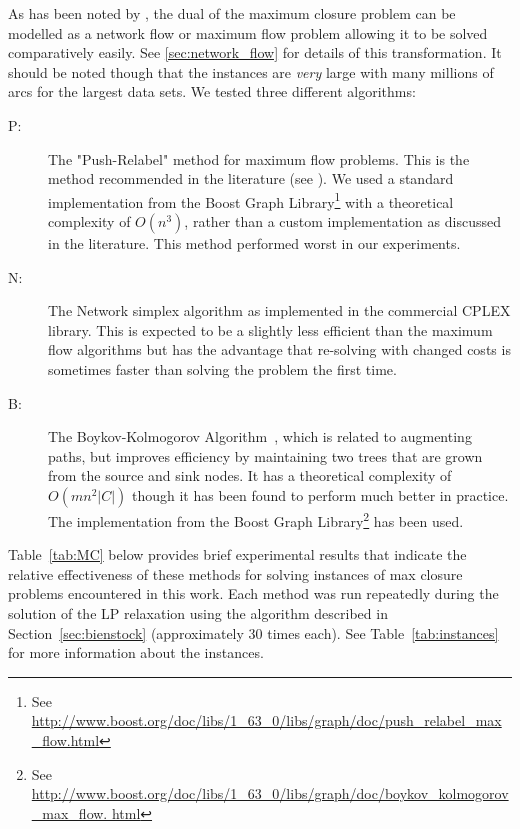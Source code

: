 \documentclass[authoryear,11pt,square,number,times,super,comma]{elsarticle}
\begin{document}
As has been noted by \cite{dorit_s._hochbaum_performance_2000}, the dual of the maximum closure problem can be modelled as a network flow or maximum flow
problem allowing it to be solved comparatively easily. See \ref{sec:network_flow} for details of this transformation. It should be noted
though that the instances are \emph{very} large with many millions of arcs for
the largest data sets. We tested three different algorithms:
\begin{description}
  \item[\quad P:] The "Push-Relabel" method for maximum flow problems. This is the method recommended in the literature (see \cite{dorit_s._hochbaum_performance_2000}). 
  We used a standard implementation from the Boost Graph Library\footnote{See \url{http://www.boost.org/doc/libs/1_63_0/libs/graph/doc/push_relabel_max_flow.html}} 
  with a theoretical complexity of $O(n^3)$, rather than a custom implementation as discussed in the literature. This method performed worst in our 
  experiments.
  \item[\quad N:] The Network simplex algorithm as implemented in the commercial CPLEX library. This is expected to be a slightly less efficient than the maximum 
  flow algorithms but has the advantage that re-solving with changed costs is sometimes faster than solving the problem the first time.
  \item[\quad B:] The Boykov-Kolmogorov Algorithm~\citep{boykov_experimental_2001}, which is related to augmenting paths, but improves efficiency by maintaining two 
  trees that are grown from the source and sink nodes. It has a theoretical complexity of $O(mn^2 |C|)$ though it has been found to perform much better 
  in practice. The implementation from the Boost Graph Library\footnote{See \url{http://www.boost.org/doc/libs/1_63_0/libs/graph/doc/boykov_kolmogorov_max_flow.
html} } has been used. 
\end{description}
Table~\ref{tab:MC} below provides  brief experimental results that indicate the relative effectiveness of these methods for solving 
instances of max closure problems encountered in this work. Each method was run repeatedly during the solution of the LP relaxation using the algorithm 
described in Section~\ref{sec:bienstock} (approximately 30 times each). See Table~\ref{tab:instances} for more information about the instances.
\end{document}
